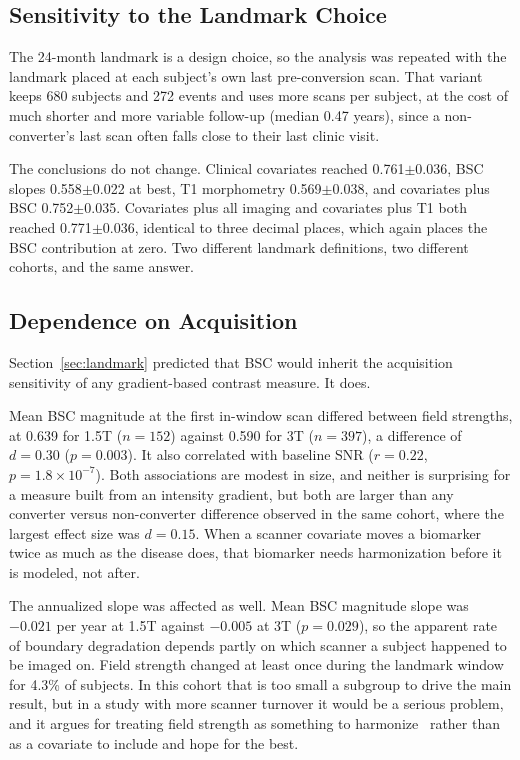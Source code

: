 \documentclass[blue]{ludusofficial}  %
\begin{document}
\subsection{Sensitivity to the Landmark Choice}
\label{sec:sensitivity}

The 24-month landmark is a design choice, so the analysis was repeated with the landmark placed at each subject's own last pre-conversion scan. That variant keeps 680 subjects and 272 events and uses more scans per subject, at the cost of much shorter and more variable follow-up (median 0.47 years), since a non-converter's last scan often falls close to their last clinic visit.

The conclusions do not change. Clinical covariates reached 0.761$\pm$0.036, BSC slopes 0.558$\pm$0.022 at best, T1 morphometry 0.569$\pm$0.038, and covariates plus BSC 0.752$\pm$0.035. Covariates plus all imaging and covariates plus T1 both reached 0.771$\pm$0.036, identical to three decimal places, which again places the BSC contribution at zero. Two different landmark definitions, two different cohorts, and the same answer.

\subsection{Dependence on Acquisition}
\label{sec:acquisition}

Section~\ref{sec:landmark} predicted that BSC would inherit the acquisition sensitivity of any gradient-based contrast measure. It does.

Mean BSC magnitude at the first in-window scan differed between field strengths, at 0.639 for 1.5T ($n=152$) against 0.590 for 3T ($n=397$), a difference of $d=0.30$ ($p=0.003$). It also correlated with baseline SNR ($r=0.22$, $p=1.8\times10^{-7}$). Both associations are modest in size, and neither is surprising for a measure built from an intensity gradient, but both are larger than any converter versus non-converter difference observed in the same cohort, where the largest effect size was $d=0.15$. When a scanner covariate moves a biomarker twice as much as the disease does, that biomarker needs harmonization before it is modeled, not after.

The annualized slope was affected as well. Mean BSC magnitude slope was $-0.021$ per year at 1.5T against $-0.005$ at 3T ($p=0.029$), so the apparent rate of boundary degradation depends partly on which scanner a subject happened to be imaged on. Field strength changed at least once during the landmark window for 4.3\% of subjects. In this cohort that is too small a subgroup to drive the main result, but in a study with more scanner turnover it would be a serious problem, and it argues for treating field strength as something to harmonize~\cite{fortin2018harmonization} rather than as a covariate to include and hope for the best.
\end{document}
